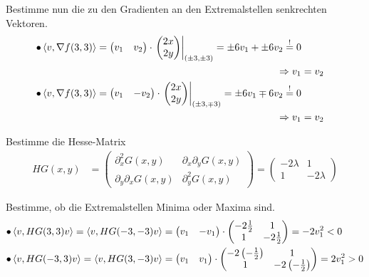 \documentclass{article}
\newcommand{\lr}[1]{\left(#1\right)}
\begin{document}
{	Bestimme nun die zu den Gradienten an den Extremalstellen senkrechten Vektoren.
		\begin{align*}
			\bullet \braket{v, \nabla f(3,3)} =
			\begin{pmatrix}
				v_1 & v_2
			\end{pmatrix}
			\cdot
			\left.
			\begin{pmatrix}
				2x\\
				2y
			\end{pmatrix}
			\right|_{(\pm 3,\pm 3)}
			=
			\pm 6v_1 + \pm 6v_2 \stackrel{!}{=} 0 \\
			\Rightarrow v_1 &= v_2\\
			\bullet \braket{v, \nabla f(3,3)} =
			\begin{pmatrix}
				v_1 & -v_2
			\end{pmatrix}
			\cdot
			\left.
			\begin{pmatrix}
				2x\\
				2y
			\end{pmatrix}
			\right|_{(\pm 3,\mp 3)}
			=
			\pm 6v_1 \mp 6v_2 \stackrel{!}{=} 0\\
			\Rightarrow v_1 &= v_2
		\end{align*}
	
	
	Bestimme die Hesse-Matrix
		\begin{align*}
			HG(x,y) &=
			\begin{pmatrix}
				\partial_x^2 G(x,y) & \partial_x\partial_y G(x,y) \\
				\partial_y\partial_x G(x,y)  & \partial_y^2 G(x,y) 
			\end{pmatrix}
			=
			\begin{pmatrix}
				-2\lambda & 1 \\
				1 & -2\lambda
			\end{pmatrix}
		\end{align*}
	
	Bestimme, ob die Extremalstellen Minima oder Maxima sind.
		\begin{align*}
			\bullet \braket{v, HG(3,3) v} = \braket{v, HG(-3,-3) v} &=
			\begin{pmatrix}
				v_1 & -v_1
			\end{pmatrix}
			\cdot
			\begin{pmatrix}
				-2\frac{1}{2} & 1\\
				1 & -2\frac{1}{2}
			\end{pmatrix}
			=
			-2v_1^2 < 0\\
			\bullet \braket{v, HG(-3,3) v} = \braket{v, HG(3,-3) v} &=
			\begin{pmatrix}
				v_1 & v_1
			\end{pmatrix}
			\cdot
			\begin{pmatrix}
				-2\lr{-\frac{1}{2}} & 1\\
				1 & -2\lr{-\frac{1}{2}}
			\end{pmatrix}
			=
			2v_1^2 > 0
		\end{align*}
	
}
\end{document}
